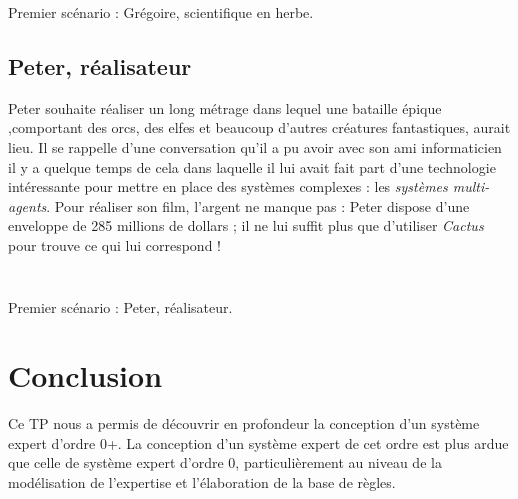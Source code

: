 \documentclass[a4paper,12pt]{article}
\begin{document}
\begin{listing}[H]
	\centering
	\inputminted[breaklines=true,linenos,lastline=42]{text}{../scenarioGreg.txt}
\end{listing}
	
\begin{listing}[H]
	\centering
	\inputminted[breaklines=true,linenos,firstline=43]{text}{../scenarioGreg.txt}
	\caption{Premier scénario : Grégoire, scientifique en herbe.}
\end{listing}


	\subsection{Peter, réalisateur}
	
	Peter souhaite réaliser un long métrage dans lequel une bataille épique ,comportant des orcs, des elfes et beaucoup d'autres créatures fantastiques, aurait lieu. Il se rappelle d'une conversation qu'il a pu avoir avec son ami informaticien il y a quelque temps de cela dans laquelle il lui avait fait part d'une technologie intéressante pour mettre en place des systèmes complexes : les \textit{systèmes multi-agents}. Pour réaliser son film, l'argent ne manque pas : Peter dispose d'une enveloppe de 285 millions de dollars ; il ne lui suffit plus que d'utiliser \textit{Cactus} pour trouve ce qui lui correspond !


\begin{listing}[H]
	\centering
	\inputminted[breaklines=true,linenos,lastline=12]{text}{../scenarioPeter.txt}
\end{listing}
	
\begin{listing}[H]
	\centering
	\inputminted[breaklines=true,linenos,firstline=13]{text}{../scenarioPeter.txt}
	\caption{Premier scénario : Peter, réalisateur.}
\end{listing}

\newpage
\section{Conclusion}

	Ce TP nous a permis de découvrir en profondeur la conception d'un système expert d'ordre 0+. La conception d'un système expert de cet ordre est plus ardue que celle de système expert d'ordre 0, particulièrement au niveau de la modélisation de l'expertise et l'élaboration de la base de règles.
\end{document}
